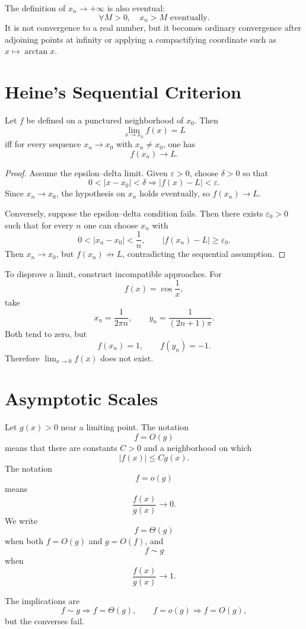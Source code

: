 The definition of \(x_n\to+\infty\) is also eventual:
\[
  \forall M>0,
  \quad
  x_n>M\text{ eventually}.
\]
It is not convergence to a real number, but it becomes ordinary convergence after adjoining points at infinity or applying a compactifying coordinate such as \(x\mapsto\arctan x\).

\section{Heine's Sequential Criterion}

\begin{theorem}
Let \(f\) be defined on a punctured neighborhood of \(x_0\).  Then
\[
  \lim_{x\to x_0}f(x)=L
\]
iff for every sequence \(x_n\to x_0\) with \(x_n\ne x_0\), one has
\[
  f(x_n)\to L.
\]
\end{theorem}

\begin{proof}
Assume the epsilon--delta limit.  Given \(\varepsilon>0\), choose \(\delta>0\) so that
\[
  0<|x-x_0|<\delta
  \Longrightarrow
  |f(x)-L|<\varepsilon.
\]
Since \(x_n\to x_0\), the hypothesis on \(x_n\) holds eventually, so \(f(x_n)\to L\).

Conversely, suppose the epsilon--delta condition fails.  Then there exists \(\varepsilon_0>0\) such that for every \(n\) one can choose \(x_n\) with
\[
  0<|x_n-x_0|<\frac1n,
  \qquad
  |f(x_n)-L|\ge\varepsilon_0.
\]
Then \(x_n\to x_0\), but \(f(x_n)\not\to L\), contradicting the sequential assumption.
\end{proof}

To disprove a limit, construct incompatible approaches.  For
\[
  f(x)=\cos\frac1x,
\]
take
\[
  x_n=\frac1{2\pi n},
  \qquad
  y_n=\frac1{(2n+1)\pi}.
\]
Both tend to zero, but
\[
  f(x_n)=1,
  \qquad
  f(y_n)=-1.
\]
Therefore \(\lim_{x\to0}f(x)\) does not exist.

\section{Asymptotic Scales}

Let \(g(x)>0\) near a limiting point.  The notation
\[
  f=O(g)
\]
means that there are constants \(C>0\) and a neighborhood on which
\[
  |f(x)|\le Cg(x).
\]
The notation
\[
  f=o(g)
\]
means
\[
  \frac{f(x)}{g(x)}\to0.
\]
We write
\[
  f=\Theta(g)
\]
when both \(f=O(g)\) and \(g=O(f)\), and
\[
  f\sim g
\]
when
\[
  \frac{f(x)}{g(x)}\to1.
\]

The implications are
\[
  f\sim g
  \Longrightarrow
  f=\Theta(g),
  \qquad
  f=o(g)
  \Longrightarrow
  f=O(g),
\]
but the converses fail.

